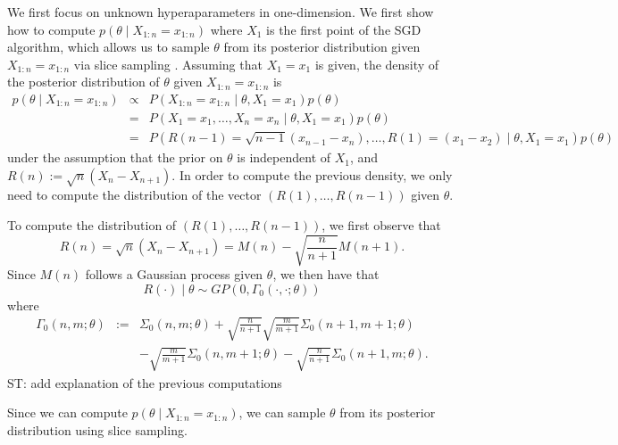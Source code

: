 \documentclass[12pt,english]{article}
\newcommand{\stcomment}[1]{{\color{blue} ST: #1}}
\begin{document}
We first focus on unknown hyperaparameters in one-dimension. We first show how to compute $p\left(\theta\mid X_{1:n} = x_{1:n}\right)$ where $X_{1}$ is the first point of the SGD algorithm, which allows us to sample $\theta$ from its posterior distribution given $X_{1:n} = x_{1:n}$ via slice sampling \citep{radford2003Slice}. Assuming that $X_{1}=x_{1}$ is given, the density of the posterior distribution of $\theta$ given $X_{1:n} = x_{1:n}$ is
\begin{eqnarray*}
p\left(\theta\mid X_{1:n} = x_{1:n}\right) & \propto & P\left(X_{1:n} = x_{1:n}\mid\theta,X_{1}=x_{1}\right)p\left(\theta\right)\\
 & = & P\left(X_{1}=x_{1},\ldots,X_{n}=x_{n}\mid\theta,X_{1}=x_{1}\right)p\left(\theta\right)\\
 & = & P\left(R\left(n-1\right)=\sqrt{n-1}\left(x_{n-1}-x_{n}\right),\ldots,R\left(1\right)=\left(x_{1}-x_{2}\right)\mid\theta,X_{1}=x_{1}\right)p\left(\theta\right)
\end{eqnarray*}
under the assumption that the prior on $\theta$ is independent of $X_{1}$, and $R(n):= \sqrt{n}\left(X_{n}-X_{n+1}\right)$. In order to compute the previous density, we only need to compute the distribution of the vector $(R(1),\ldots,R(n-1))$ given $\theta$. 

To compute the distribution of $(R(1),\ldots,R(n-1))$, we first observe that 
\[
R(n) = \sqrt{n}\left(X_{n}-X_{n+1}\right) = M\left(n\right)-\sqrt{\frac{n}{n+1}}M\left(n+1\right).
\]
Since $M(n)$ follows a Gaussian process given $\theta$, we then have that
\[
R(\cdot)\mid\theta\sim GP\left(0,\Gamma_{0}\left(\cdot,\cdot;\theta\right)\right)
\]
where 
\begin{eqnarray*}
\Gamma_{0}\left(n,m;\theta\right) & := & \Sigma_{0}\left(n,m;\theta\right)+\sqrt{\frac{n}{n+1}}\sqrt{\frac{m}{m+1}}\Sigma_{0}\left(n+1,m+1;\theta\right)\\
 &  & -\sqrt{\frac{m}{m+1}}\Sigma_{0}\left(n,m+1;\theta\right)-\sqrt{\frac{n}{n+1}}\Sigma_{0}\left(n+1,m;\theta\right).
\end{eqnarray*}
\stcomment{add explanation of the previous computations}

Since we can compute $p\left(\theta\mid X_{1:n} = x_{1:n}\right)$, we can sample $\theta$ from its posterior distribution using slice sampling. 
\end{document}
